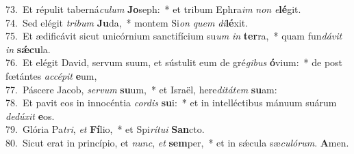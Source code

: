{73.~}Et répulit taberná\textit{cu}\textit{lum} \textbf{Jo}seph:~* et tribum Ephra\textit{im} \textit{non} \textit{e}\textbf{lé}git.\\
{74.~}Sed elégit \textit{tri}\textit{bum} \textbf{Ju}da,~* montem Si\textit{on} \textit{quem} \textit{di}\textbf{lé}xit.\\
{75.~}Et ædificávit sicut unicórnium sanctifícium su\textit{um} \textit{in} \textbf{ter}ra,~* quam fun\textit{dá}\textit{vit} \textit{in} \textbf{sǽ}\textbf{cu}la.\\
{76.~}Et elégit David, servum suum, et sústulit eum de gré\textit{gi}\textit{bus} \textbf{ó}vium:~* de post fœtántes \textit{ac}\textit{cé}\textit{pit} \textbf{e}um,\\
{77.~}Páscere Jacob, \textit{ser}\textit{vum} \textbf{su}um,~* et Israël, here\textit{di}\textit{tá}\textit{tem} \textbf{su}am:\\
{78.~}Et pavit eos in innocéntia \textit{cor}\textit{dis} \textbf{su}i:~* et in intelléctibus mánuum suárum \textit{de}\textit{dú}\textit{xit} \textbf{e}os.\\
{79.~}Glória Pa\textit{tri}, \textit{et} \textbf{Fí}lio,~* et Spi\textit{rí}\textit{tu}\textit{i} \textbf{San}cto.\\
{80.~}Sicut erat in princípio, et \textit{nunc}, \textit{et} \textbf{sem}per,~* et in sǽcula sæ\textit{cu}\textit{ló}\textit{rum}. \textbf{A}men.\\
